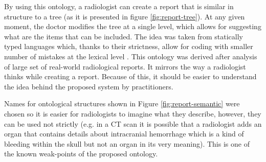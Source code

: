 \documentclass[12pt, twoside, openany]{report}
\theoremstyle{definition}
\begin{document}
By using this ontology, a radiologist can create a report that is similar in structure to a tree (as it is presented in figure \ref{fig:report-tree}). At any given moment, the doctor modifies the tree at a single level, which allows for suggesting what are the items that can be included. The idea was taken from statically typed languages which, thanks to their strictness, allow for coding with smaller number of mistakes at the lexical level \cite{static-lang}. This ontology was derived after analysis of large set of real-world radiological reports. It mirrors the way a radiologist thinks while creating a report. Because of this, it should be easier to understand the idea behind the proposed system by practitioners.

Names for ontological structures shown in Figure \ref{fig:report-semantic} were chosen so it is easier for radiologists to imagine what they describe, however, they can be used not strictly (e.g. in a CT scan it is possible that a radiologist adds an organ that contains details about intracranial hemorrhage which is a kind of bleeding within the skull \cite{ich} but not an organ in its very meaning). This is one of the known weak-points of the proposed ontology.
\end{document}

